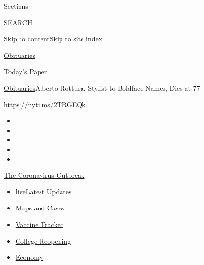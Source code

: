 Sections

SEARCH

\protect\hyperlink{site-content}{Skip to
content}\protect\hyperlink{site-index}{Skip to site index}

\href{https://www.nytimes.com/section/obituaries}{Obituaries}

\href{https://myaccount.nytimes.com/auth/login?response_type=cookie\&client_id=vi}{}

\href{https://www.nytimes.com/section/todayspaper}{Today's Paper}

\href{/section/obituaries}{Obituaries}\textbar{}Alberto Rottura, Stylist
to Boldface Names, Dies at 77

\url{https://nyti.ms/2TRGEQk}

\begin{itemize}
\item
\item
\item
\item
\item
\end{itemize}

\href{https://www.nytimes.com/news-event/coronavirus?action=click\&pgtype=Article\&state=default\&region=TOP_BANNER\&context=storylines_menu}{The
Coronavirus Outbreak}

\begin{itemize}
\tightlist
\item
  live\href{https://www.nytimes.com/2020/08/03/world/coronavirus-covid-19.html?action=click\&pgtype=Article\&state=default\&region=TOP_BANNER\&context=storylines_menu}{Latest
  Updates}
\item
  \href{https://www.nytimes.com/interactive/2020/us/coronavirus-us-cases.html?action=click\&pgtype=Article\&state=default\&region=TOP_BANNER\&context=storylines_menu}{Maps
  and Cases}
\item
  \href{https://www.nytimes.com/interactive/2020/science/coronavirus-vaccine-tracker.html?action=click\&pgtype=Article\&state=default\&region=TOP_BANNER\&context=storylines_menu}{Vaccine
  Tracker}
\item
  \href{https://www.nytimes.com/2020/08/02/us/covid-college-reopening.html?action=click\&pgtype=Article\&state=default\&region=TOP_BANNER\&context=storylines_menu}{College
  Reopening}
\item
  \href{https://www.nytimes.com/live/2020/08/03/business/stock-market-today-coronavirus?action=click\&pgtype=Article\&state=default\&region=TOP_BANNER\&context=storylines_menu}{Economy}
\end{itemize}

